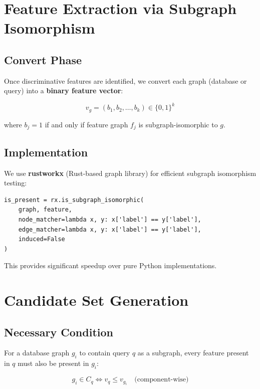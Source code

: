 \documentclass[12pt,a4paper]{article}
\begin{document}
\section{Feature Extraction via Subgraph Isomorphism}

\subsection{Convert Phase}

Once discriminative features are identified, we convert each graph (database or query) into a \textbf{binary feature vector}:

\[
v_g = (b_1, b_2, \ldots, b_k) \in \{0,1\}^k
\]

where $b_j = 1$ if and only if feature graph $f_j$ is subgraph-isomorphic to $g$.

\subsection{Implementation}

We use \textbf{rustworkx} (Rust-based graph library) for efficient subgraph isomorphism testing:

\begin{verbatim}
is_present = rx.is_subgraph_isomorphic(
    graph, feature,
    node_matcher=lambda x, y: x['label'] == y['label'],
    edge_matcher=lambda x, y: x['label'] == y['label'],
    induced=False
)
\end{verbatim}

This provides significant speedup over pure Python implementations.

\section{Candidate Set Generation}

\subsection{Necessary Condition}

For a database graph $g_i$ to contain query $q$ as a subgraph, every feature present in $q$ must also be present in $g_i$:

\[
g_i \in C_q \iff v_q \leq v_{g_i} \quad \text{(component-wise)}
\]
\end{document}
